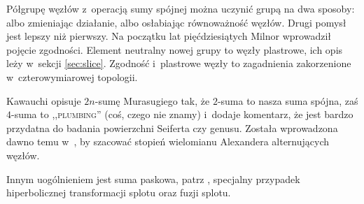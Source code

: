 Półgrupę węzłów z~operacją sumy spójnej można uczynić grupą na dwa sposoby: albo zmieniając działanie, albo osłabiając równoważność węzłów.
Drugi pomysł jest lepszy niż pierwszy.
Na początku lat pięćdziesiątych Milnor wprowadził pojęcie zgodności.
%
%
%
Element neutralny nowej grupy to węzły plastrowe, ich opis leży w~sekcji \ref{sec:slice}.
Zgodność i~plastrowe węzły to zagadnienia zakorzenione w~czterowymiarowej topologii.

Kawauchi \cite[s. 50-53]{kawauchi1996} opisuje $2n$-sumę Murasugiego tak, że $2$-suma to nasza suma spójna, zaś $4$-suma to \textsc{,,plumbing''} (coś, czego nie znamy) i~dodaje komentarz, że jest bardzo przydatna do badania powierzchni Seiferta czy genusu.
%
%
Została wprowadzona dawno temu w~\cite{murasugi1958}, by szacować stopień wielomianu Alexandera alternujących węzłów.
%
%
%

Innym uogólnieniem jest suma paskowa, patrz \cite[s. 31-32, 43]{kawauchi1996}, specjalny przypadek hiperbolicznej transformacji splotu oraz fuzji splotu.
%
%
%

